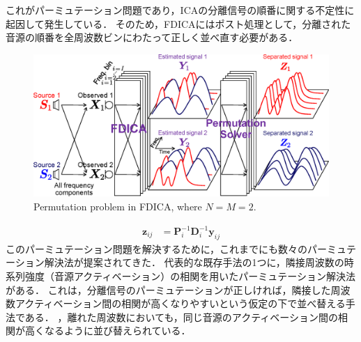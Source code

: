 これがパーミュテーション問題であり，ICAの分離信号の順番に関する不定性に起因して発生している．
そのため，FDICAにはポスト処理として，分離された音源の順番を全周波数ビンにわたって正しく並べ直す必要がある．
\begin{figure}[t]
    \begin{center}
        \includegraphics[width=0.95\columnwidth]{figures/permutation_image.eps}
    \end{center}
    \vspace{-8pt}
	\caption{Permutation problem in FDICA, where $N=M=2$.}
	\label{fig:permu}
\end{figure}
\begin{align}
\bm{z}_{ij} &= \bm{P}_{i}^{-1}\bm{D}_{i}^{-1}\bm{y}_{ij} \label{eq:z}
\end{align}
このパーミュテーション問題を解決するために，これまでにも数々のパーミュテーション解決法が提案されてきた．
代表的な既存手法の1つに，隣接周波数の時系列強度（音源アクティベーション）の相関を用いたパーミュテーション解決法がある．
これは，分離信号のパーミュテーションが正しければ，隣接した周波数アクティベーション間の相関が高くなりやすいという仮定の下で並べ替える手法である．
，離れた周波数においても，同じ音源のアクティベーション間の相関が高くなるように並び替えられている．

